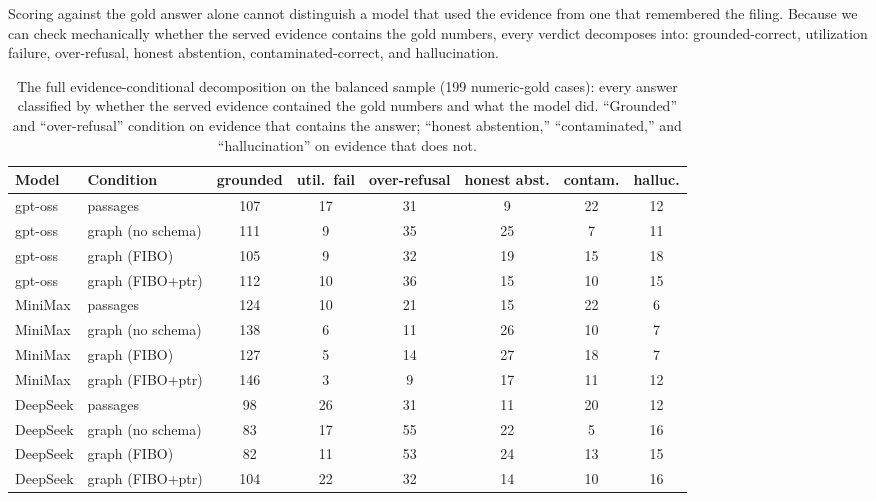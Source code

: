 \documentclass{article}
\begin{document}
Scoring against the gold answer alone cannot distinguish a model that used
the evidence from one that remembered the filing. Because we can check
mechanically whether the served evidence contains the gold numbers, every
verdict decomposes into: grounded-correct, utilization failure,
over-refusal, honest abstention, contaminated-correct, and hallucination.

\begin{table}[h]
\centering\small
\caption{The full evidence-conditional decomposition on the balanced
sample (199 numeric-gold cases): every answer classified by whether the
served evidence contained the gold numbers and what the model did.
``Grounded'' and ``over-refusal'' condition on evidence that contains the
answer; ``honest abstention,'' ``contaminated,'' and ``hallucination'' on
evidence that does not.}
\label{tab:ec-app}
\begin{tabular}{llcccccc}
\toprule
Model & Condition & grounded & util.\ fail & over-refusal & honest abst. & contam. & halluc. \\
\midrule
gpt-oss & passages & 107 & 17 & 31 & 9 & 22 & 12 \\
gpt-oss & graph (no schema) & 111 & 9 & 35 & 25 & 7 & 11 \\
gpt-oss & graph (FIBO) & 105 & 9 & 32 & 19 & 15 & 18 \\
gpt-oss & graph (FIBO+ptr) & 112 & 10 & 36 & 15 & 10 & 15 \\
MiniMax & passages & 124 & 10 & 21 & 15 & 22 & 6 \\
MiniMax & graph (no schema) & 138 & 6 & 11 & 26 & 10 & 7 \\
MiniMax & graph (FIBO) & 127 & 5 & 14 & 27 & 18 & 7 \\
MiniMax & graph (FIBO+ptr) & 146 & 3 & 9 & 17 & 11 & 12 \\
DeepSeek & passages & 98 & 26 & 31 & 11 & 20 & 12 \\
DeepSeek & graph (no schema) & 83 & 17 & 55 & 22 & 5 & 16 \\
DeepSeek & graph (FIBO) & 82 & 11 & 53 & 24 & 13 & 15 \\
DeepSeek & graph (FIBO+ptr) & 104 & 22 & 32 & 14 & 10 & 16 \\
\bottomrule
\end{tabular}
\end{table}
\end{document}
